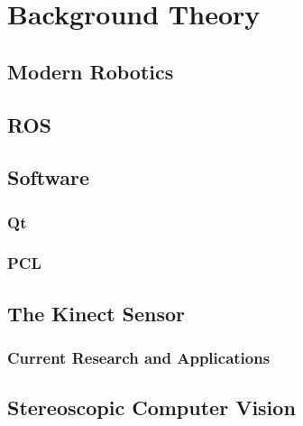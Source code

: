 \chapter{Background Theory}
\label{chp:theory} 

\section{Modern Robotics}

\section{ROS}

\section{Software}

\subsection{Qt}

\subsection{PCL}

\section{The Kinect Sensor}

\subsection{Current Research and Applications}

\section{Stereoscopic Computer Vision}


